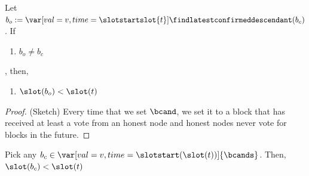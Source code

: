 \documentclass{article}
\begin{document}

\begin{lemma}\label{lem:output-find-latest-different-to-input-then-output-older-than-current-slot}
    Let $b_o := \var[val=v,time=\slotstartslot{t}]{\findlatestconfirmeddescendant}(b_c)$.
    If 
    \begin{enumerate}
        \item $b_o \neq b_c$
    \end{enumerate},
    then, 
    \begin{enumerate}
        \item $\slot(b_o) < \slot(t)$
    \end{enumerate}    
\end{lemma}

\begin{proof}(Sketch)
    Every time that we set $\bcand$, we set it to a block that has received at least a vote from an honest node and honest nodes never vote for blocks in the future.
\end{proof}

\begin{lemma}\label{lem:bcand-less-than-current-slot}
    Pick any $b_c \in  \var[val=v,time=\slotstart(\slot(t))]{\bcands}$.
    Then, $\slot(b_c) < \slot(t)$
\end{lemma}
\end{document}

